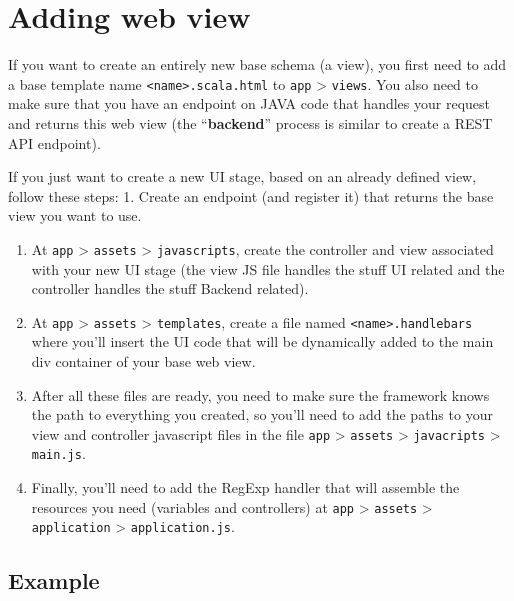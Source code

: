 \documentclass[
  11pt,
]{krantz}
\begin{document}
\hypertarget{adding-web-view}{%
\section{Adding web view}\label{adding-web-view}}

If you want to create an entirely new base schema (a view), you first need to add a base template name \texttt{\textless{}name\textgreater{}.scala.html} to \texttt{app} \textgreater{} \texttt{views}. You also need to make sure that you have an endpoint on JAVA code that handles your request and returns this web view (the ``\textbf{backend}'' process is similar to create a REST API endpoint).

If you just want to create a new UI stage, based on an already defined view, follow these steps:
1. Create an endpoint (and register it) that returns the base view you want to use.

\begin{enumerate}
\def\labelenumi{\arabic{enumi}.}
\setcounter{enumi}{1}
\item
  At \texttt{app} \textgreater{} \texttt{assets} \textgreater{} \texttt{javascripts}, create the controller and view associated with your new UI stage (the view JS file handles the stuff UI related and the controller handles the stuff Backend related).
\item
  At \texttt{app} \textgreater{} \texttt{assets} \textgreater{} \texttt{templates}, create a file named \texttt{\textless{}name\textgreater{}.handlebars} where you'll insert the UI code that will be dynamically added to the main div container of your base web view.
\item
  After all these files are ready, you need to make sure the framework knows the path to everything you created, so you'll need to add the paths to your view and controller javascript files in the file \texttt{app} \textgreater{} \texttt{assets} \textgreater{} \texttt{javacripts} \textgreater{} \texttt{main.js}.
\item
  Finally, you'll need to add the RegExp handler that will assemble the resources you need (variables and controllers) at \texttt{app} \textgreater{} \texttt{assets} \textgreater{} \texttt{application} \textgreater{} \texttt{application.js}.
\end{enumerate}

\hypertarget{example-1}{%
\subsection{Example}\label{example-1}}
\end{document}
